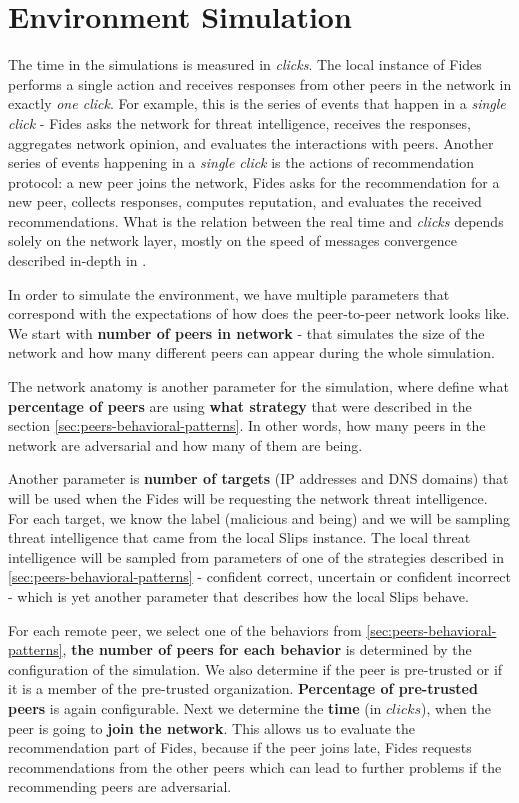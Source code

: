 \section{Environment Simulation}
\label{sec:environment-simulation}
The time in the simulations is measured in \textit{clicks}. 
The local instance of Fides performs a single action and receives responses from other peers in the network in exactly \textit{one click}. 
For example, this is the series of events that happen in a \textit{single click} - Fides asks the network for threat intelligence, receives the responses, aggregates network opinion, and evaluates the interactions with peers.
Another series of events happening in a \textit{single click} is the actions of  recommendation protocol: a new peer joins the network, Fides asks for the recommendation for  a new peer, collects responses, computes reputation, and evaluates the received recommendations.
What is the relation between the real time and \textit{clicks} depends solely on the network layer, mostly on the speed of messages convergence described in-depth in \cite{nl}.

In order to simulate the environment, we have multiple parameters that correspond with the expectations of how does the peer-to-peer network looks like.
We start with \textbf{number of peers in network} - that simulates the size of the network and how many different peers can appear during the whole simulation.

The network anatomy is another parameter for the simulation, where define what \textbf{percentage of peers} are using \textbf{what strategy} that were described in the section \ref{sec:peers-behavioral-patterns}. 
In other words, how many peers in the network are adversarial and how many of them are being.

Another parameter is \textbf{number of targets} (IP addresses and DNS domains) that will be used when the Fides will be requesting the network threat intelligence.
For each target, we know the label (malicious and being) and we will be sampling threat intelligence that came from the local Slips instance. 
The local threat intelligence will be sampled from parameters of one of the strategies described in \ref{sec:peers-behavioral-patterns} - confident correct, uncertain or confident incorrect - which is yet another parameter that describes how the local Slips behave.

For each remote peer, we select one of the behaviors from \ref{sec:peers-behavioral-patterns}, \textbf{the number of peers for each behavior} is determined by the configuration of the simulation.
We also determine if the peer is pre-trusted or if it is a member of the pre-trusted organization. \textbf{Percentage of pre-trusted peers} is again configurable.
Next we determine the \textbf{time} (in $clicks$), when the peer is going to \textbf{join the network}. This allows us to evaluate the recommendation part of Fides, because if the peer joins late, Fides requests recommendations from the other peers which can lead to further problems if the recommending peers are adversarial.


